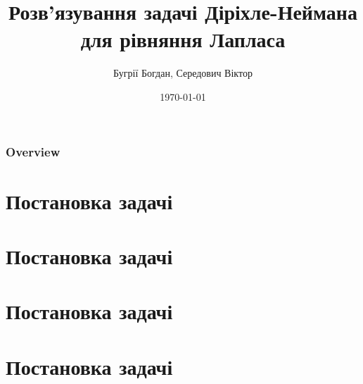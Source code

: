 \documentclass{beamer}
\title[Short title]{Розв'язування задачі Діріхле-Неймана для рівняння Лапласа} %
\author{Бугрії Богдан, Середович Віктор} %
\institute[UCLA] %
{
	Львівський національний університет імені Івана Франка \\
	Факультет прикладної математики та інформатики 
}
\date{\today} %
\begin{document}
	
	\begin{frame}
		\titlepage
	\end{frame}
	
	
	\begin{frame}
		\frametitle{Overview}
		\tableofcontents
	\end{frame}


	\section{Постановка задачі} 
	
	\begin{frame}
		
	\end{frame}


	
	\section{Постановка задачі} 
	
	\begin{frame}
		
	\end{frame}
	
	
	
	\section{Постановка задачі} 
	
	\begin{frame}
		
	\end{frame}
	
	
	
	\section{Постановка задачі} 
	
\end{document}
